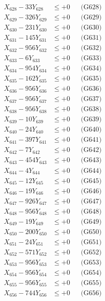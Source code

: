 \documentclass[a4paper,10pt]{article}
\begin{document}
{\begin{align}
X_{628} - 33Y_{628} &\leq +0 && \text{(G628)} \\
X_{629} - 326Y_{629} &\leq +0 && \text{(G629)} \\
X_{630} - 231Y_{630} &\leq +0 && \text{(G630)} \\
\allowbreak
X_{631} - 145Y_{631} &\leq +0 && \text{(G631)} \\
X_{632} - 956Y_{632} &\leq +0 && \text{(G632)} \\
X_{633} - 6Y_{633} &\leq +0 && \text{(G633)} \\
X_{634} - 954Y_{634} &\leq +0 && \text{(G634)} \\
X_{635} - 162Y_{635} &\leq +0 && \text{(G635)} \\
X_{636} - 956Y_{636} &\leq +0 && \text{(G636)} \\
X_{637} - 956Y_{637} &\leq +0 && \text{(G637)} \\
X_{638} - 956Y_{638} &\leq +0 && \text{(G638)} \\
X_{639} - 10Y_{639} &\leq +0 && \text{(G639)} \\
X_{640} - 24Y_{640} &\leq +0 && \text{(G640)} \\
\allowbreak
X_{641} - 397Y_{641} &\leq +0 && \text{(G641)} \\
X_{642} - 7Y_{642} &\leq +0 && \text{(G642)} \\
X_{643} - 454Y_{643} &\leq +0 && \text{(G643)} \\
X_{644} - 4Y_{644} &\leq +0 && \text{(G644)} \\
X_{645} - 12Y_{645} &\leq +0 && \text{(G645)} \\
X_{646} - 19Y_{646} &\leq +0 && \text{(G646)} \\
X_{647} - 926Y_{647} &\leq +0 && \text{(G647)} \\
X_{648} - 956Y_{648} &\leq +0 && \text{(G648)} \\
X_{649} - 19Y_{649} &\leq +0 && \text{(G649)} \\
X_{650} - 200Y_{650} &\leq +0 && \text{(G650)} \\
\allowbreak
X_{651} - 24Y_{651} &\leq +0 && \text{(G651)} \\
X_{652} - 571Y_{652} &\leq +0 && \text{(G652)} \\
X_{653} - 956Y_{653} &\leq +0 && \text{(G653)} \\
X_{654} - 956Y_{654} &\leq +0 && \text{(G654)} \\
X_{655} - 956Y_{655} &\leq +0 && \text{(G655)} \\
X_{656} - 744Y_{656} &\leq +0 && \text{(G656)} \\

\end{align}}
\end{document}
